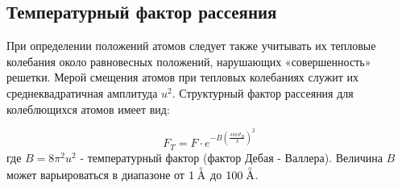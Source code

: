\subsection{Температурный фактор рассеяния}
При определении положений атомов следует также
учитывать их тепловые колебания около равновесных
 положений, нарушающих «совершенность» решетки.
 Мерой смещения атомов при тепловых колебаниях служит
 их среднеквадратичная амплитуда $u^2$.
 Структурный фактор рассеяния для колеблющихся атомов имеет вид:

 \begin{equation}
   F_T = F\cdot e^{-B(\frac{sin\vartheta_B}{\lambda})^2}
  \end{equation}
где $B = 8 \pi^2 u^2$ - температурный фактор (фактор Дебая - Валлера).
Величина $B$ может варьироваться в диапазоне от $1 \angstrom $ до $ 100\angstrom $.
